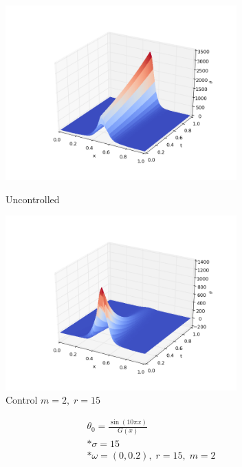 \documentclass[a4:paper,14pt]{article}
\begin{document}
\begin{figure}[h]
\centering
\begin{minipage}{.5\textwidth}
  \centering
  \includegraphics[width=3.5in]{ex_s15}
  \caption{Uncontrolled}
  \label{fig:test1}
\end{minipage}%
\begin{minipage}{.5\textwidth}
  \centering
  \includegraphics[width=3.5in]{re_s15}
  \caption{Control $m = 2, \; r = 15$}
  \label{fig:test2}
\end{minipage}
\end{figure}

\begin{gather}
    \theta_0 = \frac{\sin(10 \pi x)}{G(x)} \\*
    \sigma = 15 \\*
    \omega = (0, 0.2), \; r = 15, \; m = 2
\end{gather}
\end{document}
